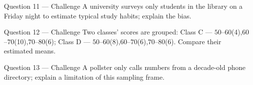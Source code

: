 \documentclass[11pt]{article}
\begin{document}
\begin{qbox}{Question 11 --- Challenge}
A university surveys only students in the library on a Friday night to estimate typical study habits; explain the bias.\workspace{3cm}
\end{qbox}

\begin{qbox}{Question 12 --- Challenge}
Two classes' scores are grouped: Class C --- $50$--$60$(4),$60$--$70$(10),$70$--$80$(6); Class D --- $50$--$60$(8),$60$--$70$(6),$70$--$80$(6). Compare their estimated means.\workspace{3.4cm}
\end{qbox}

\begin{qbox}{Question 13 --- Challenge}
A pollster only calls numbers from a decade-old phone directory; explain a limitation of this sampling frame.\workspace{3cm}
\end{qbox}

\clearpage
{}
\end{document}
